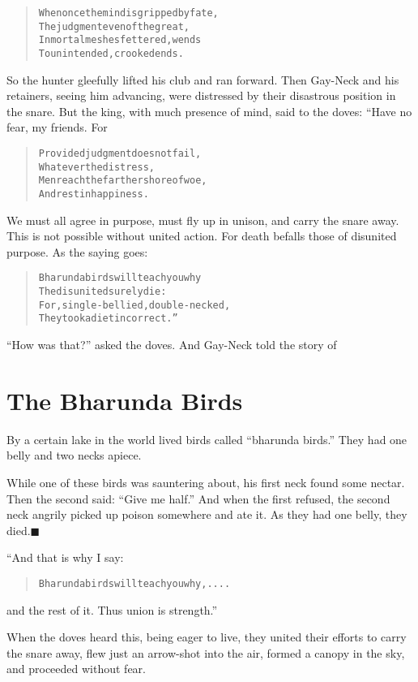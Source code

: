 \documentclass[article, twoside, 14pt]{memoir}
\newcommand{\qed}{\hfill \ensuremath{\blacksquare}}
\renewenvironment{verbatim}{%
\begin{quote}%
\vskip -10pt%
\begin{alltt}\normalfont\large}{\end{alltt}%
\end{quote}%
\vskip -10pt
} %
\begin{document}
\begin{verbatim}
When once the mind is gripped by fate,
The judgment even of the great,
In mortal meshes fettered, wends
To unintended, crooked ends.
\end{verbatim}
So the hunter gleefully lifted his club and ran forward. Then
Gay-Neck and his retainers, seeing him advancing, were distressed
by their disastrous position in the snare. But the king, with much
presence of mind, said to the doves: “Have no fear, my friends.
For

\begin{verbatim}
Provided judgment does not fail,
    Whatever the distress,
Men reach the farther shore of woe,
    And rest in happiness.
\end{verbatim}
We must all agree in purpose, must fly up in unison, and carry the
snare away. This is not possible without united action. For death
befalls those of disunited purpose. As the saying goes:

\begin{verbatim}
Bharunda birds will teach you why
The disunited surely die:
For, single-bellied, double-necked,
They took a diet incorrect.”
\end{verbatim}
``How was that?'' asked the doves. And Gay-Neck told the story of

\chapter{The Bharunda Birds}

\label{s37}

By a certain lake in the world lived birds called
``bharunda birds.'' They had one belly and two necks apiece.

While one of these birds was sauntering about, his first neck found
some nectar. Then the second said: ``Give me half.'' And when the
first refused, the second neck angrily picked up poison somewhere
and ate it. As they had one belly, they died.\hyperref[s37]{\qed}

“And that is why I say:

\begin{verbatim}
    Bharunda birds will teach you why, ....
\end{verbatim}
and the rest of it. Thus union is strength.”

When the doves heard this, being eager to live, they united their
efforts to carry the snare away, flew just an arrow-shot into
the air, formed a canopy in the sky, and proceeded without fear.
\end{document}
